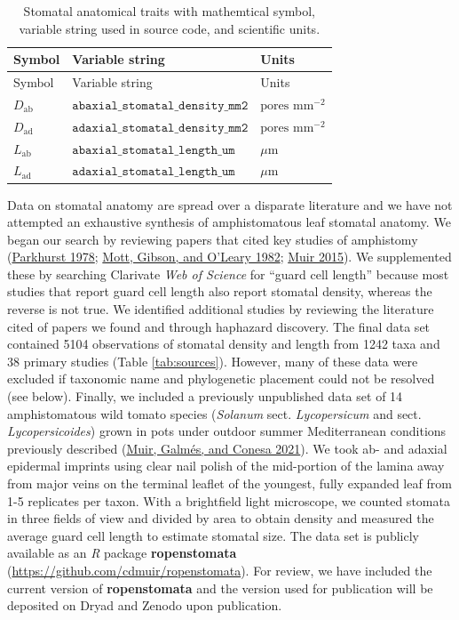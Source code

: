 \documentclass[
  10pt,
]{article}
\begin{document}
\begin{longtable}[]{@{}
  >{\centering\arraybackslash}p{}
  >{\centering\arraybackslash}p{}
  >{\centering\arraybackslash}p{}@{}}
\caption{\label{tab:traits}Stomatal anatomical traits with mathemtical symbol, variable string used in source code, and scientific units.}\tabularnewline
\toprule
Symbol & Variable string & Units \\
\midrule
\endfirsthead
\toprule
Symbol & Variable string & Units \\
\midrule
\endhead
\(D_\mathrm{ab}\) & \(\mathtt{abaxial\_stomatal\_density\_mm2}\) & \(\text{pores mm}^{-2}\) \\
\(D_\mathrm{ad}\) & \(\mathtt{adaxial\_stomatal\_density\_mm2}\) & \(\text{pores mm}^{-2}\) \\
\(L_\mathrm{ab}\) & \(\mathtt{abaxial\_stomatal\_length\_um}\) & \(\mu\)m \\
\(L_\mathrm{ad}\) & \(\mathtt{adaxial\_stomatal\_length\_um}\) & \(\mu\)m \\
\bottomrule
\end{longtable}

Data on stomatal anatomy are spread over a disparate literature and we have not attempted an exhaustive synthesis of amphistomatous leaf stomatal anatomy. We began our search by reviewing papers that cited key studies of amphistomy (\protect\hyperlink{ref-parkhurst_adaptive_1978}{Parkhurst 1978}; \protect\hyperlink{ref-mott_adaptive_1982}{Mott, Gibson, and O'Leary 1982}; \protect\hyperlink{ref-muir_making_2015}{Muir 2015}). We supplemented these by searching Clarivate \emph{Web of Science} for ``guard cell length'' because most studies that report guard cell length also report stomatal density, whereas the reverse is not true. We identified additional studies by reviewing the literature cited of papers we found and through haphazard discovery. The final data set contained 5104 observations of stomatal density and length from 1242 taxa and 38 primary studies (Table \ref{tab:sources}). However, many of these data were excluded if taxonomic name and phylogenetic placement could not be resolved (see below). Finally, we included a previously unpublished data set of 14 amphistomatous wild tomato species (\emph{Solanum} sect. \emph{Lycopersicum} and sect. \emph{Lycopersicoides}) grown in pots under outdoor summer Mediterranean conditions previously described (\protect\hyperlink{ref-muir_unpublished_2021}{Muir, Galmés, and Conesa 2021}). We took ab- and adaxial epidermal imprints using clear nail polish of the mid-portion of the lamina away from major veins on the terminal leaflet of the youngest, fully expanded leaf from 1-5 replicates per taxon. With a brightfield light microscope, we counted stomata in three fields of view and divided by area to obtain density and measured the average guard cell length to estimate stomatal size. The data set is publicly available as an \emph{R} package \textbf{ropenstomata} (\url{https://github.com/cdmuir/ropenstomata}). For review, we have included the current version of \textbf{ropenstomata} and the version used for publication will be deposited on Dryad and Zenodo upon publication.
\end{document}
